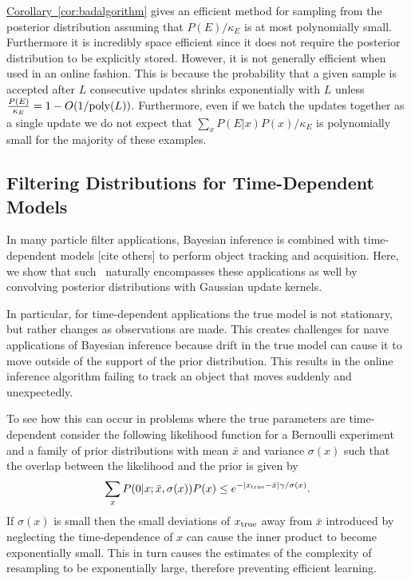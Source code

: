 \documentclass[twoside]{article}
\newcommand{\cor}[1]{\hyperref[cor:#1]{Corollary~\ref*{cor:#1}}}
\newcommand{\CRej}{\text{rejection filtering}}
\begin{document}
\cor{badalgorithm} gives an efficient method for sampling from the posterior distribution assuming that $P(E)/\kappa_E$ is at most polynomially small.  Furthermore it is incredibly space efficient since it does not require the posterior distribution to be explicitly stored.  However, it is not generally efficient when  used in an online fashion.  This is because the probability that a given sample is accepted after $L$ consecutive updates shrinks exponentially with $L$ unless $\frac{P(E)}{\kappa_E}=1-O(1/{\rm poly}(L))$.  Furthermore, even if we batch the updates together as a single update we do not expect that $\sum_x P(E|x) P(x) /\kappa_E$ is polynomially small for the majority of these examples.  

\subsection{Filtering Distributions for Time-Dependent Models}
\label{sec:time-dep}

In many particle filter applications, Bayesian inference is combined with
time-dependent models [cite others] \cite{isard_condensationconditional_1998}
to perform object tracking and acquisition. Here, we show that such
\CRej~naturally encompasses these applications as well by convolving posterior
distributions with Gaussian update kernels.

In particular, for time-dependent applications the true model is not
stationary, but rather changes as observations are made.  This creates
challenges for na\i ve applications of Bayesian inference because drift in the
true model can cause it to move outside of the support of the  prior
distribution.  This results in the online inference algorithm failing to track
an object that moves suddenly and unexpectedly.

To see how this can occur in problems where the true parameters are time-dependent consider the following likelihood function for a Bernoulli experiment
and a family of prior distributions with mean $\bar{x}$ and variance $\sigma(x)$ such that
the overlap between the likelihood and the prior is given by
\begin{equation}
    \sum_x P(0|x; \bar{x}, \sigma(x)) P(x) \le e^{-|x_{\rm true} - \bar{x}| \gamma/\sigma(x)}.
\end{equation}
If $\sigma(x)$ is small then the small deviations of $x_{\rm true}$ away from $\bar{x}$ introduced by neglecting the time-dependence of $x$ can cause the inner product to become exponentially small.
This in turn causes the estimates of the complexity of resampling to be exponentially large, therefore preventing efficient learning.
\end{document}

